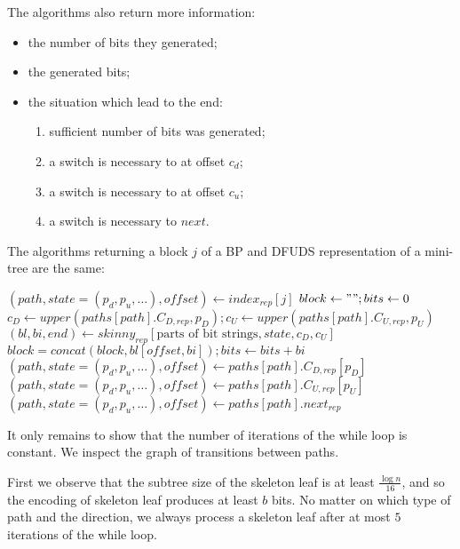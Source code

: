 The algorithms also return more information:
\begin{itemize}
	\item the number of bits they generated;
	\item the generated bits;
	\item the situation which lead to the end:
	\begin{enumerate}
		\item sufficient number of bits was generated;
		\item a switch is necessary to at offset $c_d$;
		\item a switch is necessary to at offset $c_u$;
		\item a switch is necessary to $next$.
	\end{enumerate}
\end{itemize}

The algorithms returning a block $j$ of a BP and DFUDS representation of a mini-tree are the same:

\begin{algorithm}
\begin{algorithmic}
	\State $(path, state=(p_d, p_u, \ldots), offset) \gets index_{rep}[j]$
	\State $block \gets ""; bits \gets 0$
		\State $c_D \gets upper(paths[path].C_{D, rep}, p_D); c_U \gets upper(paths[path].C_{U, rep}, p_U)$
		\State $(bl, bi, end) \gets skinny_{rep}[\textrm{parts of bit strings}, state, c_D, c_U]$
		\State $block = concat(block, bl[offset, bi]); bits \gets bits + bi$
			\State $(path, state=(p_d, p_u, \ldots), offset) \gets paths[path].C_{D, rep}[p_D]$
			\State $(path, state=(p_d, p_u, \ldots), offset) \gets paths[path].C_{U, rep}[p_U]$
				\State \Break
			\Else
				\State $(path, state=(p_d, p_u, \ldots), offset) \gets paths[path].next_{rep}$
			\EndIf
		\EndIf
	\EndWhile
	\State {}
\EndFunction
\end{algorithmic}
\end{algorithm}

It only remains to show that the number of iterations of the while loop is constant.
We inspect the graph of transitions between paths.


First we observe that the subtree size of the skeleton leaf is at least $\frac{\log n}{16}$, and so the encoding of skeleton leaf produces at least $b$ bits.
No matter on which type of path and the direction, we always process a skeleton leaf after at most $5$ iterations of the while loop.

